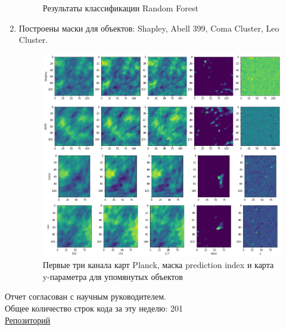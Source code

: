 \documentclass{article}
\begin{document}
\begin{enumerate}
\begin{figure}[h]
        \caption{Результаты классификации Random Forest}
        \end{figure}
    \item Построены маски для объектов: Shapley, Abell 399, Coma Cluster, Leo Cluster.\\
        \begin{figure}[h]
                \includegraphics[width=0.7\linewidth]{4clusters} 
                \caption{Первые три канала карт Planck, маска prediction index и карта y-параметра
                    для упомянутых объектов}
        \end{figure}

\end{enumerate}

Отчет согласован с научным руководителем.\\
Общее количество строк кода за эту неделю: 201\\
\hyperlink{https://github.com/rt2122/data-segmentation-2}{Репозиторий}\\ 
\end{document}
